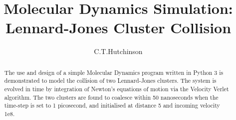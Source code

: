 \documentclass{article}
\begin{document}
\title{Molecular Dynamics Simulation: \break Lennard-Jones Cluster Collision}
\author{C.T.Hutchinson}
\maketitle

\newpage




\begin{abstract}
The use and design of a simple Molecular Dynamics program written in Python 3 is demonstrated to model the collision of two Lennard-Jones clusters. The system is evolved in time by integration of Newton's equations of motion via the Velocity Verlet algorithm. The two clusters are found to coalesce within 50 nanoseconds when the time-step is set to 1 picosecond, and initialised at distance 5 and incoming velocity 1e8.
\end{abstract}
\end{document}
